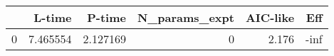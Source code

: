 \begin{tabular}{lrrrrr}
\toprule
{} &    L-time &    P-time &  N\_params\_expt &  AIC-like &  Eff \\
\midrule
0 &  7.465554 &  2.127169 &              0 &     2.176 & -inf \\
\bottomrule
\end{tabular}
